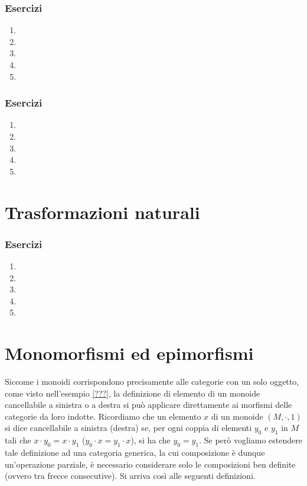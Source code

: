 \subsubsection*{Esercizi}
\begin{enumerate}
	\item
	\item
	\item
	\item
	\item
\end{enumerate}

\subsubsection*{Esercizi}
\begin{enumerate}
	\item
	\item
	\item
	\item
	\item
\end{enumerate}


\section{Trasformazioni naturali}\label{sec_tnat}

\subsubsection*{Esercizi}
\begin{enumerate}
	\item
	\item
	\item
	\item
	\item
\end{enumerate}

\section{Monomorfismi ed epimorfismi}

Siccome i monoidi corrispondono precisamente alle categorie con un solo oggetto, come visto nell'esempio \ref{???},
la definizione di elemento di un monoide cancellabile a sinistra o a destra si può applicare direttamente ai morfismi delle categorie da loro indotte.
Ricordiamo che un elemento \(x\) di un monoide \((M, \cdot, 1)\) si dice cancellabile a sinistra (destra) se,
per ogni coppia di elementi \(y_0\) e \(y_1\) in \(M\) tali che \(x \cdot y_0 = x \cdot y_1\) (\(y_0 \cdot x = y_1 \cdot x\)),
si ha che \(y_0 = y_1\).
Se però vogliamo estendere tale definizione ad una categoria generica,
la cui composizione è dunque un'operazione parziale,
è necessario considerare solo le composizioni ben definite
(ovvero tra frecce consecutive).
Si arriva così alle seguenti definizioni.

